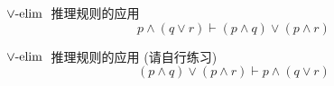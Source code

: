 \begin{frame}{}
  \begin{exampleblock}{$\lor\text{-elim}\;$ 推理规则的应用}
    \[
      p \land (q \lor r) \vdash (p \land q) \lor (p \land r)
    \]
  \end{exampleblock}

\end{frame}

\begin{frame}{}
  \begin{exampleblock}{$\lor\text{-elim}\;$ 推理规则的应用 (请自行练习)}
    \[
      (p \land q) \lor (p \land r) \vdash p \land (q \lor r)
    \]
  \end{exampleblock}
\end{frame}

